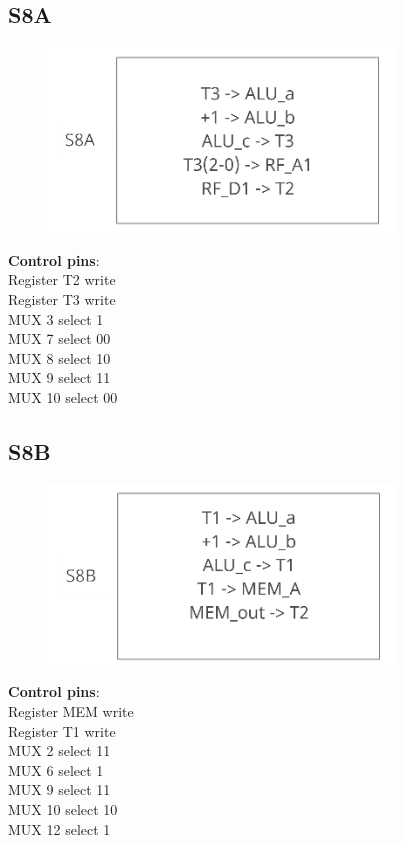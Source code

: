 \documentclass[11pt, fleqn]{article}
\begin{document}
\bigskip

\subsection*{\centering S8A}
\begin{figure}[H]
    \centering
    \includegraphics{DataPath/DataPath_S8A.PNG}
\end{figure}
\begin{center}
\textbf{Control pins}: \\
Register T2 write \\
Register T3 write \\
MUX 3 select 1 \\
MUX 7 select 00 \\
MUX 8 select 10 \\
MUX 9 select 11 \\
MUX 10 select 00 \\
\end{center}

\bigskip

\subsection*{\centering S8B}
\begin{figure}[H]
    \centering
    \includegraphics{DataPath/DataPath_S8B.PNG}
\end{figure}
\begin{center}
\textbf{Control pins}: \\
Register MEM write \\
Register T1 write \\
MUX 2 select 11 \\
MUX 6 select 1 \\
MUX 9 select 11 \\
MUX 10 select 10 \\
MUX 12 select 1 \\
\end{center}
\end{document}
